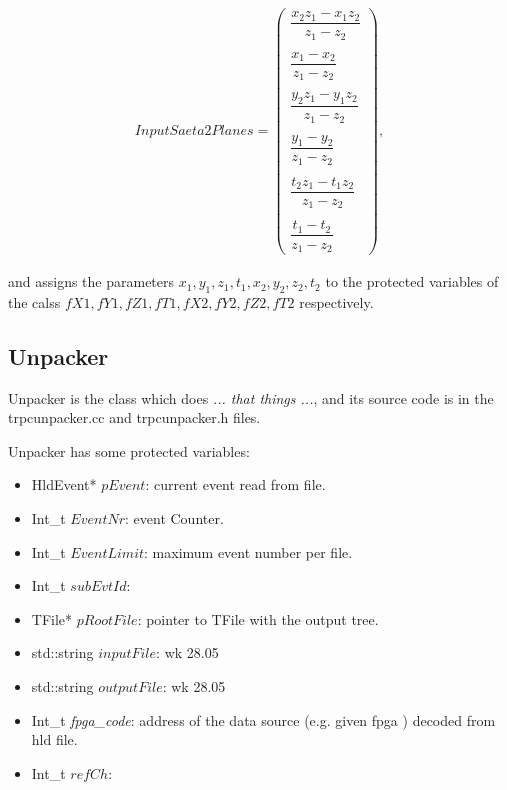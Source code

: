 \documentclass[a4paper]{book}
\begin{document}
\begin{itemize}
	\begin{align*}
	InputSaeta2Planes = \left(
	\begin{array}{c}
	 \dfrac{x_2 z_1-x_1 z_2}{z_1 - z_2}\\ \\
	 \dfrac{x_1-x_2}{z_1 - z_2} \\ \\
	 \dfrac{y_2 z_1-y_1 z_2}{z_1 - z_2} \\ \\
	 \dfrac{y_1-y_2}{z_1 - z_2} \\ \\
	 \dfrac{t_2 z_1-t_1 z_2}{z_1 - z_2} \\ \\
	 \dfrac{t_1-t_2}{z_1 - z_2}
	\end{array} \right),
	\end{align*}
	
	and assigns the parameters $x_1, y_1, z_1, t_1, x_2, y_2, z_2, t_2$ to the protected variables of the calss $fX1 , fY1, fZ1, fT1, fX2, fY2, fZ2, fT2$ respectively.
	
\end{itemize}

\subsection{Unpacker}

Unpacker is the class which does \textit{... that things ...}, and its source code is in the trpcunpacker.cc and trpcunpacker.h files.



Unpacker has some protected variables:

\begin{itemize}
	\item HldEvent* $pEvent$: current event read from file.
    \item Int\_t $EventNr$: event Counter.
    \item Int\_t $EventLimit$: maximum event number per file.
    \item Int\_t $subEvtId$:
    \item TFile* $pRootFile$: pointer to TFile with the output tree.
    \item std::string $inputFile$: wk 28.05
    \item std::string $outputFile$: wk 28.05
    \item Int\_t \textit{fpga\_code}: address of the data source (e.g. given fpga ) decoded from hld file.
    \item Int\_t $refCh$: 
\end{itemize}
\end{document}
